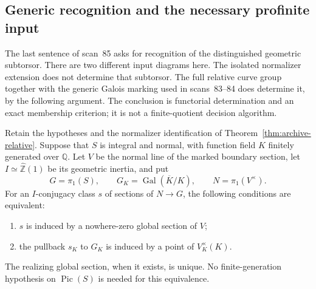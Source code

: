 \subsection{Generic recognition and the necessary profinite input}
\label{sec:archive-recognition}

The last sentence of scan~85 asks for recognition of the distinguished
geometric subtorsor. There are two different input diagrams here.
The isolated normalizer extension does not determine that subtorsor.
The full relative curve group together with the generic Galois marking
used in scans~83--84 does determine it, by the following argument.
The conclusion is functorial determination and an exact membership
criterion; it is not a finite-quotient decision algorithm.

\begin{theorem}[F149-GENERIC]\label{thm:archive-generic}
Retain the hypotheses and the normalizer identification of
Theorem~\ref{thm:archive-relative}. Suppose that $S$ is integral and
normal, with function field $K$ finitely generated over $\mathbb Q$.
Let $V$ be the normal line of the marked boundary section, let
$I\simeq\widehat{\mathbb Z}(1)$ be its geometric inertia, and put
\[
 G=\pi_1(S),\qquad G_K=\operatorname{Gal}(\overline K/K),\qquad
 N=\pi_1(V^\times).
\]
For an $I$-conjugacy class $s$ of sections of $N\to G$, the following
conditions are equivalent:
\begin{enumerate}[label=\textup{(\roman*)}]
\item $s$ is induced by a nowhere-zero global section of $V$;
\item the pullback $s_K$ to $G_K$ is induced by a point of
      $V_K^\times(K)$.
\end{enumerate}
The realizing global section, when it exists, is unique.
No finite-generation hypothesis on $\operatorname{Pic}(S)$ is needed
for this equivalence.
\end{theorem}

